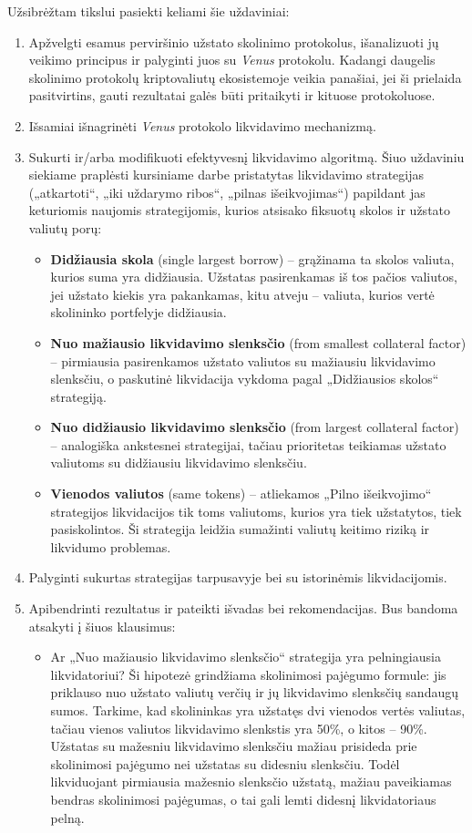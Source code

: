 \documentclass[]{VUMIFTemplateClass}
\begin{document}
Užsibrėžtam tikslui pasiekti keliami šie uždaviniai:
\begin{enumerate}
  \item Apžvelgti esamus perviršinio užstato skolinimo protokolus, išanalizuoti jų veikimo principus ir palyginti juos su \textit{Venus} protokolu. Kadangi daugelis skolinimo protokolų kriptovaliutų ekosistemoje veikia panašiai, jei ši prielaida pasitvirtins, gauti rezultatai galės būti pritaikyti ir kituose protokoluose.
  \item Išsamiai išnagrinėti \textit{Venus} protokolo likvidavimo mechanizmą.
  \item Sukurti ir/arba modifikuoti efektyvesnį likvidavimo algoritmą. Šiuo uždaviniu siekiame praplėsti kursiniame darbe pristatytas likvidavimo strategijas („atkartoti“, „iki uždarymo ribos“, „pilnas išeikvojimas“) papildant jas keturiomis naujomis strategijomis, kurios atsisako fiksuotų skolos ir užstato valiutų porų:
  \begin{itemize}
    \item \textbf{Didžiausia skola} (single largest borrow) – grąžinama ta skolos valiuta, kurios suma yra didžiausia. Užstatas pasirenkamas iš tos pačios valiutos, jei užstato kiekis yra pakankamas, kitu atveju – valiuta, kurios vertė skolininko portfelyje didžiausia.
    \item \textbf{Nuo mažiausio likvidavimo slenksčio} (from smallest collateral factor) – pirmiausia pasirenkamos užstato valiutos su mažiausiu likvidavimo slenksčiu, o paskutinė likvidacija vykdoma pagal „Didžiausios skolos“ strategiją.
    \item \textbf{Nuo didžiausio likvidavimo slenksčio} (from largest collateral factor) – analogiška ankstesnei strategijai, tačiau prioritetas teikiamas užstato valiutoms su didžiausiu likvidavimo slenksčiu.
    \item \textbf{Vienodos valiutos} (same tokens) – atliekamos „Pilno išeikvojimo“ strategijos likvidacijos tik toms valiutoms, kurios yra tiek užstatytos, tiek pasiskolintos. Ši strategija leidžia sumažinti valiutų keitimo riziką ir likvidumo problemas.
  \end{itemize}
  \item Palyginti sukurtas strategijas tarpusavyje bei su istorinėmis likvidacijomis.
  \item Apibendrinti rezultatus ir pateikti išvadas bei rekomendacijas. Bus bandoma atsakyti į šiuos klausimus:
  \begin{itemize}
    \item Ar „Nuo mažiausio likvidavimo slenksčio“ strategija yra pelningiausia likvidatoriui? Ši hipotezė grindžiama skolinimosi pajėgumo formule: jis priklauso nuo užstato valiutų verčių ir jų likvidavimo slenksčių sandaugų sumos. Tarkime, kad skolininkas yra užstatęs dvi vienodos vertės valiutas, tačiau vienos valiutos likvidavimo slenkstis yra 50\%, o kitos – 90\%. Užstatas su mažesniu likvidavimo slenksčiu mažiau prisideda prie skolinimosi pajėgumo nei užstatas su didesniu slenksčiu. Todėl likviduojant pirmiausia mažesnio slenksčio užstatą, mažiau paveikiamas bendras skolinimosi pajėgumas, o tai gali lemti didesnį likvidatoriaus pelną.

\end{itemize}
\end{enumerate}
\end{document}
